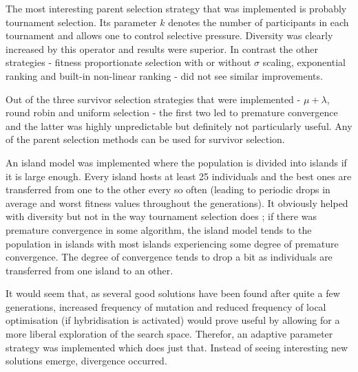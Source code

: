 

The most interesting parent selection strategy that was implemented is probably tournament selection. Its parameter $k$ denotes the number of participants in each tournament and allows one to control selective pressure. Diversity was clearly increased by this operator and results were superior. In contrast the other strategies - fitness proportionate selection with or without $\sigma$ scaling, exponential ranking and built-in non-linear ranking - did not see similar improvements.


Out of the three survivor selection strategies that were implemented - $\mu+\lambda$, round robin and uniform selection - the first two led to premature convergence and the latter was highly unpredictable but definitely not particularly useful. Any of the parent selection methods can be used for survivor selection.


An island model was implemented where the population is divided into islands if it is large enough. Every island hosts at least 25 individuals and the best ones are transferred from one to the other every so often (leading to periodic drops in average and worst fitness values throughout the generations). It obviously helped with diversity but not in the way tournament selection does ; if there was premature convergence in some algorithm, the island model tends to the population in islands with most islands experiencing some degree of premature convergence. The degree of convergence tends to drop a bit as individuals are transferred from one island to an other.


It would seem that, as several good solutions have been found after quite a few generations, increased frequency of mutation and reduced frequency of local optimisation (if hybridisation is activated) would prove useful by allowing for a more liberal exploration of the search space. Therefor, an adaptive parameter strategy was implemented which does just that. Instead of seeing interesting new solutions emerge, divergence occurred.


